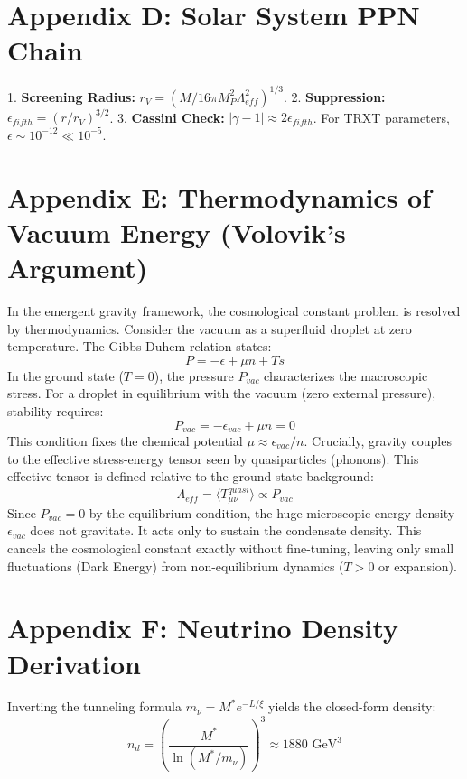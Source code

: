 \documentclass[a4paper,12pt]{article}
\begin{document}
\section{Appendix D: Solar System PPN Chain}
1. \textbf{Screening Radius:} $r_V = (M / 16\pi M_P^2 \Lambda_{eff}^2)^{1/3}$.
2. \textbf{Suppression:} $\epsilon_{fifth} = (r/r_V)^{3/2}$.
3. \textbf{Cassini Check:} $|\gamma-1| \approx 2\epsilon_{fifth}$. For TRXT parameters, $\epsilon \sim 10^{-12} \ll 10^{-5}$.

\section{Appendix E: Thermodynamics of Vacuum Energy (Volovik's Argument)}
In the emergent gravity framework, the cosmological constant problem is resolved by thermodynamics.
Consider the vacuum as a superfluid droplet at zero temperature. The Gibbs-Duhem relation states:
\begin{equation}
    P = -\epsilon + \mu n + Ts
\end{equation}
In the ground state ($T=0$), the pressure $P_{vac}$ characterizes the macroscopic stress.
For a droplet in equilibrium with the vacuum (zero external pressure), stability requires:
\begin{equation}
    P_{vac} = -\epsilon_{vac} + \mu n = 0
\end{equation}
This condition fixes the chemical potential $\mu \approx \epsilon_{vac}/n$.
Crucially, gravity couples to the effective stress-energy tensor seen by quasiparticles (phonons). This effective tensor is defined relative to the ground state background:
\begin{equation}
    \Lambda_{eff} = \langle T_{\mu\nu}^{quasi} \rangle \propto P_{vac}
\end{equation}
Since $P_{vac} = 0$ by the equilibrium condition, the huge microscopic energy density $\epsilon_{vac}$ does not gravitate. It acts only to sustain the condensate density. This cancels the cosmological constant exactly without fine-tuning, leaving only small fluctuations (Dark Energy) from non-equilibrium dynamics ($T > 0$ or expansion).

\section{Appendix F: Neutrino Density Derivation}
Inverting the tunneling formula $m_\nu = M^* e^{-L/\xi}$ yields the closed-form density:
\begin{equation}
    n_d = \left( \frac{M^*}{\ln(M^*/m_\nu)} \right)^3 \approx 1880 \text{ GeV}^3
\end{equation}
\end{document}
